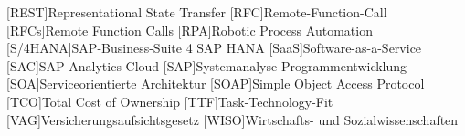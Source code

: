 \begin{acronym}[XXXXXXX]
	[REST]{Representational State Transfer}
	[RFC]{Remote-Function-Call}
	[RFCs]{Remote Function Calls}
	[RPA]{Robotic Process Automation}
	[S/4HANA]{SAP-Business-Suite 4 SAP HANA}
	[SaaS]{Software-as-a-Service}
	[SAC]{SAP Analytics Cloud}
	[SAP]{Systemanalyse Programmentwicklung}
	[SOA]{Serviceorientierte Architektur}
	[SOAP]{Simple Object Access Protocol}
	[TCO]{Total Cost of Ownership}
	[TTF]{Task-Technology-Fit}
	[VAG]{Versicherungsaufsichtsgesetz}
	[WISO]{Wirtschafts- und Sozialwissenschaften}

\end{acronym}